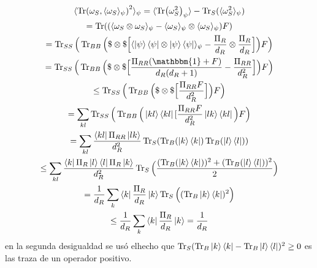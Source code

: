 \begin{multline}
\langle \Tr (\omega_{S}, \langle \omega_{S} \rangle_{\psi})^{2} \rangle_{\psi} = \langle \Tr(\omega_{S}^{2})_{\psi} \rangle - \Tr_{S} (\langle \omega_{S}^{2} \rangle_{\psi})\\
=\Tr (   (\langle \omega_{S} \otimes \omega_{S} \rangle_{\psi} - \langle \omega_{S} \rangle_{\psi} \otimes \langle \omega_{S} \rangle_{\psi} )F )\\
= \Tr_{SS} \Big( \Tr_{BB} \Big( \$ \otimes \$ \Big[ \langle \ket{\psi}\bra{\psi} \otimes  \ket{\psi}\bra{\psi}\rangle_{\psi} - \frac{\Pi_{R}}{d_{R}} \otimes  \frac{\Pi_{R}}{d_{R}}  \Big]  \Big) F \Big)\\
= \Tr_{SS} \Big( \Tr_{BB} \Big( \$ \otimes \$ \Big[ \frac{\Pi_{RR}(\mathbbm{1}+F)}{d_{R}(d_{R}+1)} - \frac{\Pi_{RR}}{d_{R}^{2}}  \Big]  \Big) F \Big)\\
\leq \Tr_{SS} \Big(  \Tr_{BB} \Big( \$ \otimes \$ \Big[ \frac{\Pi_{RR}F}{d_{R}^{2}} \Big] \Big) F \Big)\\
=  \sum_{kl}  \Tr_{SS} \Big(  \Tr_{BB} \Big( \ket{kl}\bra{kl}[ \frac{\Pi_{RR}F}{d_{R}^{2}}  \ket{lk}\bra{kl} \Big) F \Big)\\
= \sum_{kl} \frac{\bra{kl}\Pi_{RR}\ket{lk}}{d_{R}^{2}} \Tr_{S}(\Tr_{B}(\ket{k}\bra{k}) \Tr_{B}(\ket{l}\bra{l}) )\\
\leq \sum_{kl} \frac{\bra{k}\Pi_{R}\ket{l}\bra{l}\Pi_{R}\ket{k}}{d_{R}^{2}} \Tr_{S} \Big( \frac{(\Tr_{B}(\ket{k}\bra{k}))^{2}+(\Tr_{B}(\ket{l}\bra{l}))^{2}}{2} \Big)\\
=\frac{1}{d_{R}} \sum_{k} \bra{k} \frac{\Pi_{R}}{d_{R}} \ket{k} \Tr_{S} \Big( (\Tr_{B} \ket{k}\bra{k})^{2} \Big)\\
\leq \frac{1}{d_{R}} \sum_{k} \bra{k} \frac{\Pi_{R}}{d_{R}} \ket{k} =\frac{1}{d_{R}}
\end{multline}
en la segunda desigualdad se usó elhecho que $\Tr_{S} (\Tr_{B} \ket{k}\bra{k}-\Tr_{B} \ket{l}\bra{l})^{2}\geq 0$ es las traza de un operador positivo.

